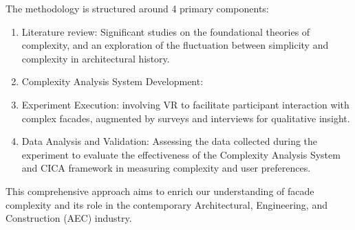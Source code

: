 The methodology is structured around 4 primary components:

\begin{enumerate}
    \item Literature review: Significant studies on the foundational theories of complexity, and an exploration of the fluctuation between simplicity and complexity in architectural history.
    \item Complexity Analysis System Development: 
    \item Experiment Execution: involving VR to facilitate participant interaction with complex facades, augmented by surveys and interviews for qualitative insight.
    \item Data Analysis and Validation: Assessing the data collected during the experiment to evaluate the effectiveness of the Complexity Analysis System and CICA framework in measuring complexity and user preferences.
\end{enumerate}

This comprehensive approach aims to enrich our understanding of facade complexity and its role in the contemporary Architectural, Engineering, and Construction (AEC) industry.

